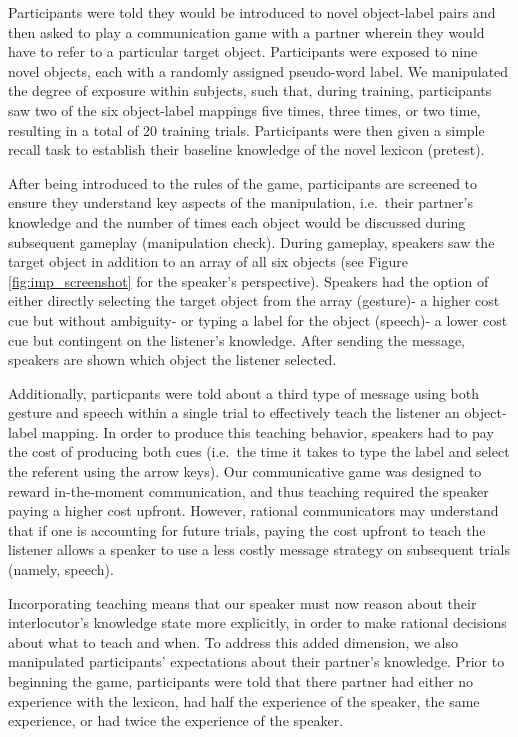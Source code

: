 \documentclass[10pt, letterpaper]{article}
\begin{document}
Participants were told they would be introduced to novel object-label
pairs and then asked to play a communication game with a partner wherein
they would have to refer to a particular target object. Participants
were exposed to nine novel objects, each with a randomly assigned
pseudo-word label. We manipulated the degree of exposure within
subjects, such that, during training, participants saw two of the six
object-label mappings five times, three times, or two time, resulting in
a total of 20 training trials. Participants were then given a simple
recall task to establish their baseline knowledge of the novel lexicon
(pretest).

After being introduced to the rules of the game, participants are
screened to ensure they understand key aspects of the manipulation,
i.e.~their partner's knowledge and the number of times each object would
be discussed during subsequent gameplay (manipulation check). During
gameplay, speakers saw the target object in addition to an array of all
six objects (see Figure \ref{fig:imp_screenshot} for the speaker's
perspective). Speakers had the option of either directly selecting the
target object from the array (gesture)- a higher cost cue but without
ambiguity- or typing a label for the object (speech)- a lower cost cue
but contingent on the listener's knowledge. After sending the message,
speakers are shown which object the listener selected.

Additionally, particpants were told about a third type of message using
both gesture and speech within a single trial to effectively teach the
listener an object-label mapping. In order to produce this teaching
behavior, speakers had to pay the cost of producing both cues (i.e.~the
time it takes to type the label and select the referent using the arrow
keys). Our communicative game was designed to reward in-the-moment
communication, and thus teaching required the speaker paying a higher
cost upfront. However, rational communicators may understand that if one
is accounting for future trials, paying the cost upfront to teach the
listener allows a speaker to use a less costly message strategy on
subsequent trials (namely, speech).

Incorporating teaching means that our speaker must now reason about
their interlocutor's knowledge state more explicitly, in order to make
rational decisions about what to teach and when. To address this added
dimension, we also manipulated participants' expectations about their
partner's knowledge. Prior to beginning the game, participants were told
that there partner had either no experience with the lexicon, had half
the experience of the speaker, the same experience, or had twice the
experience of the speaker.
\end{document}
